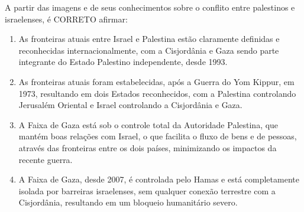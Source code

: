 A partir das imagens e de seus conhecimentos sobre o conflito entre palestinos e israelenses, é CORRETO afirmar:
\begin{enumerate}
\item As fronteiras atuais entre Israel e Palestina estão claramente definidas e reconhecidas internacionalmente, com a Cisjordânia e Gaza sendo parte integrante do Estado Palestino independente, desde 1993.
\item As fronteiras atuais foram estabelecidas, após a Guerra do Yom Kippur, em 1973, resultando em dois Estados reconhecidos, com a Palestina controlando Jerusalém Oriental e Israel controlando a Cisjordânia e Gaza.
\item A Faixa de Gaza está sob o controle total da Autoridade Palestina, que mantém boas relações com Israel, o que facilita o fluxo de bens e de pessoas, através das fronteiras entre os dois países, minimizando os impactos da recente guerra.
\item A Faixa de Gaza, desde 2007, é controlada pelo Hamas e está completamente isolada por barreiras israelenses, sem qualquer conexão terrestre com a Cisjordânia, resultando em um bloqueio humanitário severo.
\end{enumerate}
